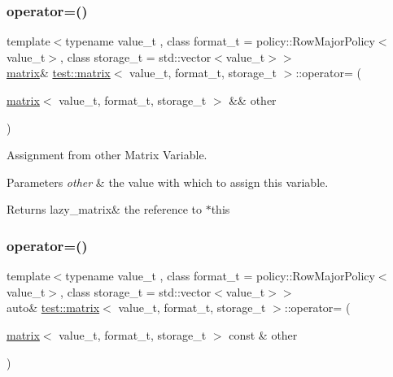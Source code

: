 \subsubsection{\texorpdfstring{operator=()}{operator=()}\hspace{0.1cm}{\footnotesize\ttfamily [3/4]}}
{\footnotesize\ttfamily template$<$typename value\+\_\+t , class format\+\_\+t  = policy\+::\+Row\+Major\+Policy$<$value\+\_\+t$>$, class storage\+\_\+t  = std\+::vector$<$value\+\_\+t$>$$>$ \\
\mbox{\hyperlink{classtest_1_1matrix}{matrix}}\& \mbox{\hyperlink{classtest_1_1matrix}{test\+::matrix}}$<$ value\+\_\+t, format\+\_\+t, storage\+\_\+t $>$\+::operator= (\begin{DoxyParamCaption}\item[{\mbox{\hyperlink{classtest_1_1matrix}{matrix}}$<$ value\+\_\+t, format\+\_\+t, storage\+\_\+t $>$ \&\&}]{other }\end{DoxyParamCaption})\hspace{0.3cm}{\ttfamily [inline]}}



Assignment from other Matrix Variable. 


\begin{DoxyParams}{Parameters}
{\em other} & the value with which to assign this variable. \\
\hline
\end{DoxyParams}
\begin{DoxyReturn}{Returns}
lazy\+\_\+matrix\& the reference to $\ast$this 
\end{DoxyReturn}
\mbox{\label{classtest_1_1matrix_ae4e2d18c1244f4c163181cc30c72a5b7}} 
\subsubsection{\texorpdfstring{operator=()}{operator=()}\hspace{0.1cm}{\footnotesize\ttfamily [4/4]}}
{\footnotesize\ttfamily template$<$typename value\+\_\+t , class format\+\_\+t  = policy\+::\+Row\+Major\+Policy$<$value\+\_\+t$>$, class storage\+\_\+t  = std\+::vector$<$value\+\_\+t$>$$>$ \\
auto\& \mbox{\hyperlink{classtest_1_1matrix}{test\+::matrix}}$<$ value\+\_\+t, format\+\_\+t, storage\+\_\+t $>$\+::operator= (\begin{DoxyParamCaption}\item[{\mbox{\hyperlink{classtest_1_1matrix}{matrix}}$<$ value\+\_\+t, format\+\_\+t, storage\+\_\+t $>$ const \&}]{other }\end{DoxyParamCaption})\hspace{0.3cm}{\ttfamily [inline]}}



